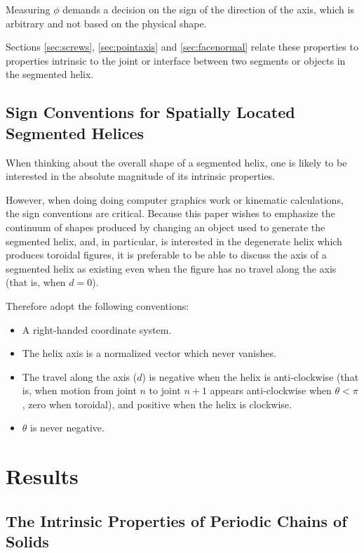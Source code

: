 \documentclass[mathematics,article,submit,pdftex,moreauthors]{Definitions/mdpi}
\begin{document}
Measuring $\phi$ demands a decision on the sign of the direction of the axis,
which is arbitrary and not based on the
physical shape.

Sections \ref{sec:screws}, \ref{sec:pointaxis} and \ref{sec:facenormal}
relate these properties to properties intrinsic to the joint or interface between
two segments or objects in the segmented helix.

\label{sec:SegmentedHelix}

\subsection{Sign Conventions for Spatially Located Segmented Helices}

When thinking about the overall shape of a segmented helix, one is
likely to be interested in the absolute magnitude of its intrinsic
properties.

However, when doing doing computer graphics work or kinematic
calculations, the sign conventions are critical. Because this
paper wishes to emphasize the continuum of shapes produced by
changing an object used to generate the segmented helix, and,
in particular, is interested in the degenerate helix which
produces toroidal figures, it is preferable to be able to discuss
the axis of a segmented helix as existing even when the
figure has no travel along the axis (that is, when $d = 0$).

Therefore adopt the following conventions:
\begin{itemize}
\item A right-handed coordinate system.
\item The helix axis is a normalized vector
  which never vanishes.
\item The travel along the axis ($d$) is negative when
  the helix is anti-clockwise (that is, when motion from
  joint $n$ to joint $n+1$ appears anti-clockwise when $\theta < \pi$,
  zero when toroidal), and
  positive when the helix is clockwise.
\item $\theta$ is never negative.
\end{itemize}

\section{Results}

\subsection{The Intrinsic Properties of Periodic Chains of Solids}
\end{document}

